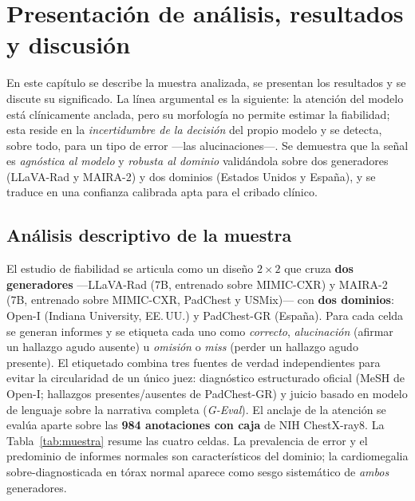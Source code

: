 \chapter{Presentación de análisis, resultados y discusión}

En este capítulo se describe la muestra analizada, se presentan los resultados y se discute su
significado. La línea argumental es la siguiente: la atención del modelo está clínicamente anclada,
pero su morfología no permite estimar la fiabilidad; esta reside en la \emph{incertidumbre de la
decisión} del propio modelo y se detecta, sobre todo, para un tipo de error —las alucinaciones—. Se
demuestra que la señal es \emph{agnóstica al modelo} y \emph{robusta al dominio} validándola sobre
dos generadores (LLaVA-Rad y MAIRA-2) y dos dominios (Estados Unidos y España), y se traduce en una
confianza calibrada apta para el cribado clínico.

\section{Análisis descriptivo de la muestra}
El estudio de fiabilidad se articula como un diseño \(2\times2\) que cruza \textbf{dos generadores}
—LLaVA-Rad (7B, entrenado sobre MIMIC-CXR) y MAIRA-2 (7B, entrenado sobre MIMIC-CXR, PadChest y
USMix)— con \textbf{dos dominios}: Open-I (Indiana University, EE.\,UU.) y PadChest-GR (España). Para
cada celda se generan informes y se etiqueta cada uno como \emph{correcto}, \emph{alucinación}
(afirmar un hallazgo agudo ausente) u \emph{omisión} o \emph{miss} (perder un hallazgo agudo
presente). El etiquetado combina tres fuentes de verdad independientes para evitar la circularidad
de un único juez: diagnóstico estructurado oficial (MeSH de Open-I; hallazgos presentes/ausentes de
PadChest-GR) y juicio basado en modelo de lenguaje sobre la narrativa completa (\emph{G-Eval}). El
anclaje de la atención se evalúa aparte sobre las \textbf{984 anotaciones con caja} de NIH
ChestX-ray8. La Tabla~\ref{tab:muestra} resume las cuatro celdas. La prevalencia de error y el
predominio de informes normales son característicos del dominio; la cardiomegalia sobre-diagnosticada
en tórax normal aparece como sesgo sistemático de \emph{ambos} generadores.

